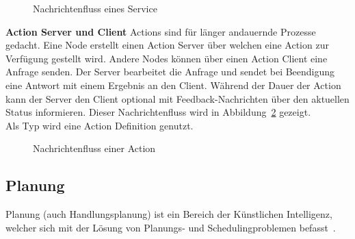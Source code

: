 \begin{figure}[ht!]
    \centering
    \caption{Nachrichtenfluss eines Service}
    \label{fig:service}
\end{figure}
\textbf{Action Server und Client} Actions sind für länger andauernde Prozesse gedacht.
Eine Node erstellt einen Action Server über welchen eine Action zur Verfügung gestellt wird.
Andere Nodes können über einen Action Client eine Anfrage senden.
Der Server bearbeitet die Anfrage und sendet bei Beendigung eine Antwort mit einem Ergebnis an den Client.
Während der Dauer der Action kann der Server den Client optional mit Feedback-Nachrichten über den aktuellen Status informieren.
Dieser Nachrichtenfluss wird in Abbildung~\ref{fig:action} gezeigt.\\
Als Typ wird eine Action Definition genutzt.\\
\begin{figure}[ht!]
    \centering
    \caption{Nachrichtenfluss einer Action}
    \label{fig:action}
\end{figure}
\subsection {Planung}
Planung (auch Handlungsplanung) ist ein Bereich der Künstlichen Intelligenz, welcher sich mit der Lösung von Planungs- und Schedulingproblemen befasst~\cite{aiplanning}.
